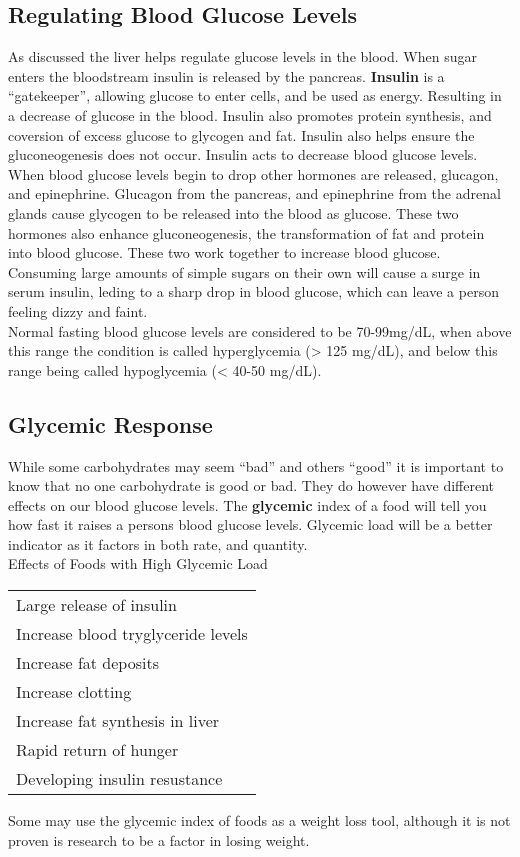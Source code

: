 \documentclass[letterpaper, 11pt]{article}
\begin{document}
\subsection{Regulating Blood Glucose Levels}
\label{sec:org8942a32}
As discussed the liver helps regulate glucose levels in the blood. When sugar enters the bloodstream insulin is released by the pancreas. \textbf{Insulin} is a ``gatekeeper'', allowing glucose to enter cells, and be used as energy. Resulting in a decrease of glucose in the blood. Insulin also promotes protein synthesis, and coversion of excess glucose to glycogen and fat. Insulin also helps ensure the gluconeogenesis does not occur. Insulin acts to decrease blood glucose levels.\\
When blood glucose levels begin to drop other hormones are released, glucagon, and epinephrine. Glucagon from the pancreas, and epinephrine from the adrenal glands cause glycogen to be released into the blood as glucose. These two hormones also enhance gluconeogenesis, the transformation of fat and protein into blood glucose. These two work together to increase blood glucose.\\
Consuming large amounts of simple sugars on their own will cause a surge in serum insulin, leding to a sharp drop in blood glucose, which can leave a person feeling dizzy and faint.\\
Normal fasting blood glucose levels are considered to be 70-99mg/dL, when above this range the condition is called hyperglycemia (> 125 mg/dL), and below this range being called hypoglycemia (< 40-50 mg/dL).\\
\subsection{Glycemic Response}
\label{sec:org62d311c}
While some carbohydrates may seem ``bad'' and others ``good'' it is important to know that no one carbohydrate is good or bad. They do however have different effects on our blood glucose levels. The \textbf{glycemic} index of a food will tell you how fast it raises a persons blood glucose levels. Glycemic load will be a better indicator as it factors in both rate, and quantity.\\
Effects of Foods with High Glycemic Load\\
\begin{center}
\begin{tabular}{l}
Large release of insulin\\
Increase blood tryglyceride levels\\
Increase fat deposits\\
Increase clotting\\
Increase fat synthesis in liver\\
Rapid return of hunger\\
Developing insulin resustance\\
\end{tabular}
\end{center}
Some may use the glycemic index of foods as a weight loss tool, although it is not proven is research to be a factor in losing weight.\\
\end{document}
